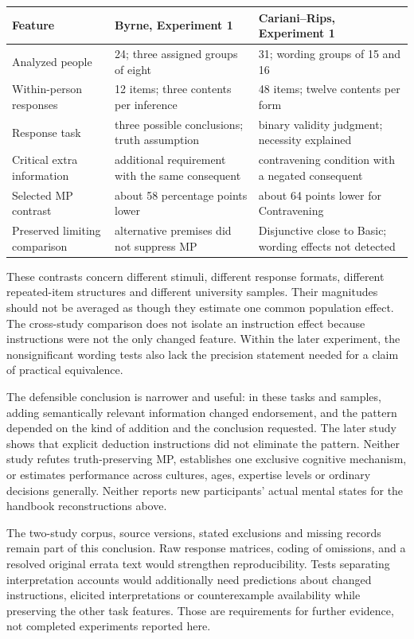 \begin{center}
\begin{tabularx}{\textwidth}{@{}l X X@{}}
\toprule
Feature & Byrne, Experiment 1 & Cariani--Rips, Experiment 1\\\midrule
Analyzed people & 24; three assigned groups of eight & 31; wording groups of 15 and 16\\
Within-person responses & 12 items; three contents per inference & 48 items; twelve contents per form\\
Response task & three possible conclusions; truth assumption & binary validity judgment; necessity explained\\
Critical extra information & additional requirement with the same consequent & contravening condition with a negated consequent\\
Selected MP contrast & about 58 percentage points lower & about 64 points lower for Contravening\\
Preserved limiting comparison & alternative premises did not suppress MP & Disjunctive close to Basic; wording effects not detected\\
\bottomrule
\end{tabularx}
\end{center}

These contrasts concern different stimuli, different response formats,
different repeated-item structures and different university samples. Their
magnitudes should not be averaged as though they estimate one common
population effect. The cross-study comparison does not isolate an
instruction effect because instructions were not the only changed feature.
Within the later experiment, the nonsignificant wording tests also lack
the precision statement needed for a claim of practical equivalence.

The defensible conclusion is narrower and useful: in these tasks and
samples, adding semantically relevant information changed endorsement,
and the pattern depended on the kind of addition and the conclusion
requested. The later study shows that explicit deduction instructions did
not eliminate the pattern. Neither study refutes truth-preserving MP,
establishes one exclusive cognitive mechanism, or estimates performance
across cultures, ages, expertise levels or ordinary decisions generally.
Neither reports new participants' actual mental states for the handbook
reconstructions above.

The two-study corpus, source versions, stated exclusions and missing records
remain part of this conclusion. Raw response matrices, coding of omissions,
and a resolved original errata text would strengthen reproducibility.
Tests separating interpretation accounts would additionally need predictions
about changed instructions, elicited interpretations or counterexample
availability while preserving the other task features. Those are requirements
for further evidence, not completed experiments reported here.
